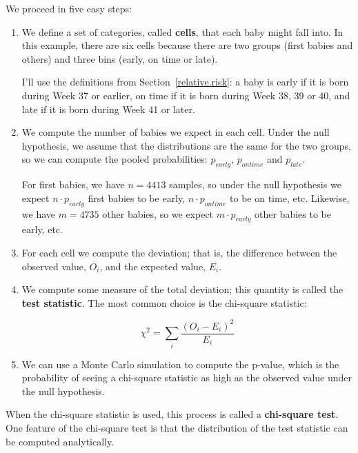 \documentclass[12pt]{book}
\begin{document}
We proceed in five easy steps:

\begin{enumerate}

\item We define a set of categories, called {\bf cells}, that each
  baby might fall into.  In this example, there are six cells because
  there are two groups (first babies and others) and three bins
  (early, on time or late).

I'll use the definitions from Section~\ref{relative.risk}: a baby is
early if it is born during Week 37 or earlier, on time if it is born
during Week 38, 39 or 40, and late if it is born during Week 41 or
later.

\item We compute the number of babies we expect in each cell.  Under
  the null hypothesis, we assume that the distributions are the same
  for the two groups, so we can compute the pooled probabilities:
  $p_{early}$, $p_{ontime}$ and $p_{late}$.

For first babies, we have $n=4413$ samples, so under the null
hypothesis we expect $n \cdot p_{early}$ first babies to be early, $n
\cdot p_{ontime}$ to be on time, etc.  Likewise, we have $m=4735$
other babies, so we expect $m \cdot p_{early}$ other babies to be
early, etc.

\item For each cell we compute the deviation; that is, the difference
  between the observed value, $O_i$, and the expected value, $E_i$.

\item We compute some measure of the total deviation; this quantity
is called the {\bf test statistic}.  The most common
choice is the chi-square statistic:

  \[ \chi^2 = \sum_i \frac{(O_i - E_i)^2}{E_i} \]


\item We can use a Monte Carlo simulation to compute the p-value,
  which is the probability of seeing a chi-square statistic as high
  as the observed value under the null hypothesis.

\end{enumerate}

When the chi-square statistic is used, this process is called a 
{\bf chi-square test}.  One feature of the chi-square test is that
the distribution of the test statistic can be computed analytically.
\end{document}
